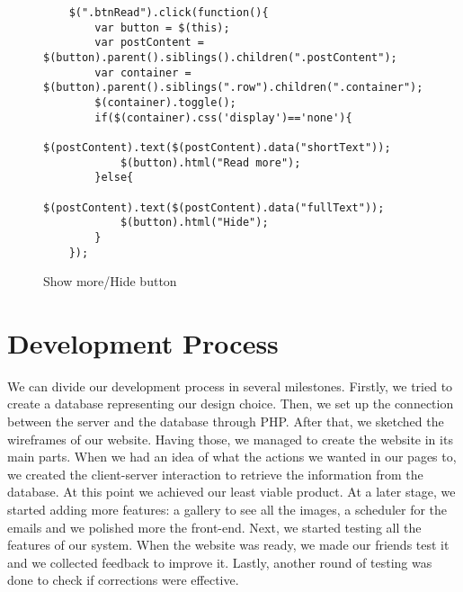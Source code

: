 \documentclass[a4paper]{article}
\begin{document}
	\begin{figure}[H]
	\centering
	\begin{BVerbatim}
	$(".btnRead").click(function(){
		var button = $(this);
		var postContent = $(button).parent().siblings().children(".postContent");
		var container = $(button).parent().siblings(".row").children(".container");
		$(container).toggle(); 
		if($(container).css('display')=='none'){
			$(postContent).text($(postContent).data("shortText"));
			$(button).html("Read more");
		}else{
			$(postContent).text($(postContent).data("fullText"));
			$(button).html("Hide");
		}
	});
	\end{BVerbatim}
	\caption{Show more/Hide button}
	\label{fig:butt}
\end{figure}

	\section{Development Process}
	We can divide our development process in several milestones. Firstly, we tried to create a database representing our design choice. Then, we set up the connection between the server and the database through PHP. After that, we sketched the wireframes of our website. Having those, we managed to create the website in its main parts. When we had an idea of what the actions we wanted in our pages to, we created the client-server interaction to retrieve the information from the database. At this point we achieved our least viable product. At a later stage, we started adding more features: a gallery to see all the images, a scheduler for the emails and we polished more the front-end. Next, we started testing all the features of our system. When the website was ready, we made our friends test it and we collected feedback to improve it. Lastly, another round of testing was done to check if corrections were effective.
	
\end{document}
